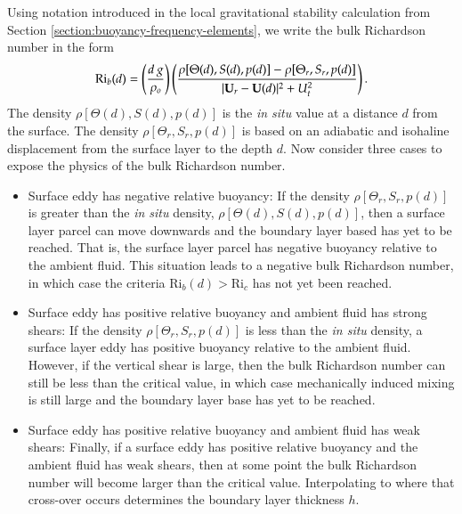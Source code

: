 Using notation introduced in the local gravitational stability
calculation from Section \ref{section:buoyancy-frequency-elements}, we
write the bulk Richardson number in the form
\begin{equation}
  \mbox{Ri}_{b}(d) = \left( \frac{d \, g}{\rho_{o}} \right) 
   \left( 
   \frac{\rho[\Theta(d), S(d), p(d)]   - \rho[\Theta_{r}, S_{r}, p(d)]}{ |{\bf U}_{r} - {\bf U}(d)|^{2} + U_{t}^{2}}
  \right). 
\label{eq:bulk-ri-large-kpp}
\end{equation}
The density $\rho[\Theta(d), S(d), p(d)]$ is the {\it in situ} value
at a distance $d$ from the surface.  The density $\rho[\Theta_{r},
S_{r}, p(d)]$ is based on an adiabatic and isohaline displacement from
the surface layer to the depth $d$.  Now consider three cases to
expose the physics of the bulk Richardson number.
\begin{itemize}

\item {\sc Surface eddy has negative relative buoyancy}: If the
  density $\rho[\Theta_{r}, S_{r}, p(d)]$ is greater than the {\it in
    situ} density, $\rho[\Theta(d), S(d), p(d)]$, then a surface layer
  parcel can move downwards and the boundary layer based has yet to be
  reached.  That is, the surface layer parcel has negative buoyancy
  relative to the ambient fluid.  This situation leads to a negative
  bulk Richardson number, in which case the criteria $\mbox{Ri}_{b}(d)
  > \mbox{Ri}_{c}$ has not yet been reached.

\item {\sc Surface eddy has positive relative buoyancy and ambient
    fluid has strong shears}: If the density $\rho[\Theta_{r}, S_{r},
  p(d)]$ is less than the {\it in situ} density, a surface layer eddy
  has positive buoyancy relative to the ambient fluid.  However, if
  the vertical shear is large, then the bulk Richardson number can
  still be less than the critical value, in which case mechanically
  induced mixing is still large and the boundary layer base has yet to
  be reached.

\item {\sc Surface eddy has positive relative buoyancy and ambient
    fluid has weak shears}: Finally, if a surface eddy has positive
  relative buoyancy and the ambient fluid has weak shears, then at
  some point the bulk Richardson number will become larger than the
  critical value.  Interpolating to where that cross-over occurs
  determines the boundary layer thickness $h$.  

\end{itemize}


